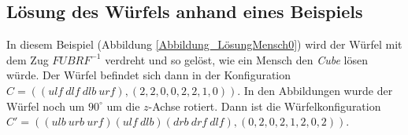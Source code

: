 \documentclass[12pt,a4paper, usenames, dvipsnames]{article}
\theoremstyle{mystyle}
\theoremstyle{definition}
\begin{document}



%
%
%
%
%
%
%
%
%
%
%
%
%
%
%
%
%
%
%
%
\subsection{Lösung des Würfels anhand eines Beispiels}

\label{Abschnitt_LösungBeispiel}

In diesem Beispiel (Abbildung \ref{Abbildung_LösungMensch0}) wird der Würfel mit dem Zug $FUBRF^{-1}$ verdreht und so gelöst, wie ein Mensch den \textit{Cube} lösen würde. Der Würfel befindet sich dann in der Konfiguration $C = ((\textit{ulf} \ \textit{dlf} \ \textit{dlb} \ \textit{urf}),(2,2,0,0,2,2,1,0))$.
In den Abbildungen wurde der Würfel noch um $90^\circ$ um die $z$-Achse rotiert. Dann ist die Würfelkonfiguration $C'=(( \textit{ulb} \ \textit{urb} \ \textit{urf})( \textit{ulf} \ \textit{dlb} )(\textit{drb} \ \textit{drf} \ \textit{dlf}),(0,2,0,2,1,2,0,2))$.
\end{document}
